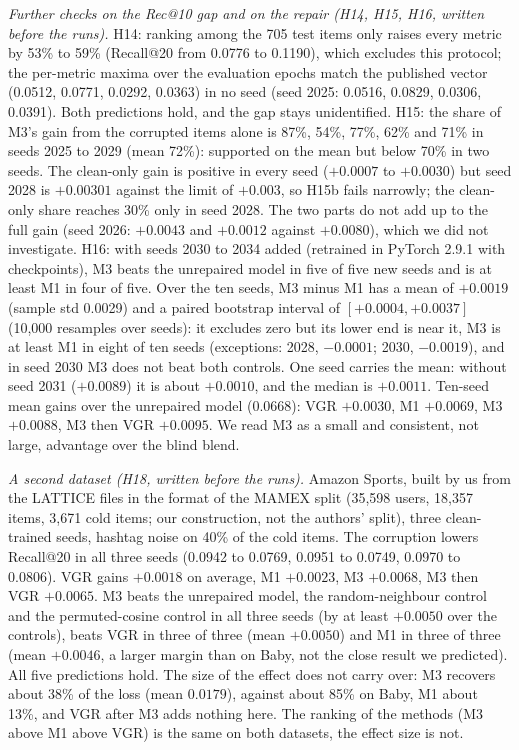 \documentclass[conference]{IEEEtran}
\begin{document}
\emph{Further checks on the Rec@10 gap and on the repair (H14, H15, H16, written before the runs).} H14: ranking among the 705 test items only raises every metric by 53\% to 59\% (Recall@20 from 0.0776 to 0.1190), which excludes this protocol; the per-metric maxima over the evaluation epochs match the published vector (0.0512, 0.0771, 0.0292, 0.0363) in no seed (seed 2025: 0.0516, 0.0829, 0.0306, 0.0391). Both predictions hold, and the gap stays unidentified. H15: the share of M3's gain from the corrupted items alone is 87\%, 54\%, 77\%, 62\% and 71\% in seeds 2025 to 2029 (mean 72\%): supported on the mean but below 70\% in two seeds. The clean-only gain is positive in every seed ($+0.0007$ to $+0.0030$) but seed 2028 is $+0.00301$ against the limit of $+0.003$, so H15b fails narrowly; the clean-only share reaches 30\% only in seed 2028. The two parts do not add up to the full gain (seed 2026: $+0.0043$ and $+0.0012$ against $+0.0080$), which we did not investigate. H16: with seeds 2030 to 2034 added (retrained in PyTorch 2.9.1 with checkpoints), M3 beats the unrepaired model in five of five new seeds and is at least M1 in four of five. Over the ten seeds, M3 minus M1 has a mean of $+0.0019$ (sample std 0.0029) and a paired bootstrap interval of $[+0.0004, +0.0037]$ (10,000 resamples over seeds): it excludes zero but its lower end is near it, M3 is at least M1 in eight of ten seeds (exceptions: 2028, $-0.0001$; 2030, $-0.0019$), and in seed 2030 M3 does not beat both controls. One seed carries the mean: without seed 2031 ($+0.0089$) it is about $+0.0010$, and the median is $+0.0011$. Ten-seed mean gains over the unrepaired model (0.0668): VGR $+0.0030$, M1 $+0.0069$, M3 $+0.0088$, M3 then VGR $+0.0095$. We read M3 as a small and consistent, not large, advantage over the blind blend.

\emph{A second dataset (H18, written before the runs).} Amazon Sports, built by us from the LATTICE files in the format of the MAMEX split (35,598 users, 18,357 items, 3,671 cold items; our construction, not the authors' split), three clean-trained seeds, hashtag noise on 40\% of the cold items. The corruption lowers Recall@20 in all three seeds (0.0942 to 0.0769, 0.0951 to 0.0749, 0.0970 to 0.0806). VGR gains $+0.0018$ on average, M1 $+0.0023$, M3 $+0.0068$, M3 then VGR $+0.0065$. M3 beats the unrepaired model, the random-neighbour control and the permuted-cosine control in all three seeds (by at least $+0.0050$ over the controls), beats VGR in three of three (mean $+0.0050$) and M1 in three of three (mean $+0.0046$, a larger margin than on Baby, not the close result we predicted). All five predictions hold. The size of the effect does not carry over: M3 recovers about 38\% of the loss (mean $0.0179$), against about 85\% on Baby, M1 about 13\%, and VGR after M3 adds nothing here. The ranking of the methods (M3 above M1 above VGR) is the same on both datasets, the effect size is not.
\end{document}
